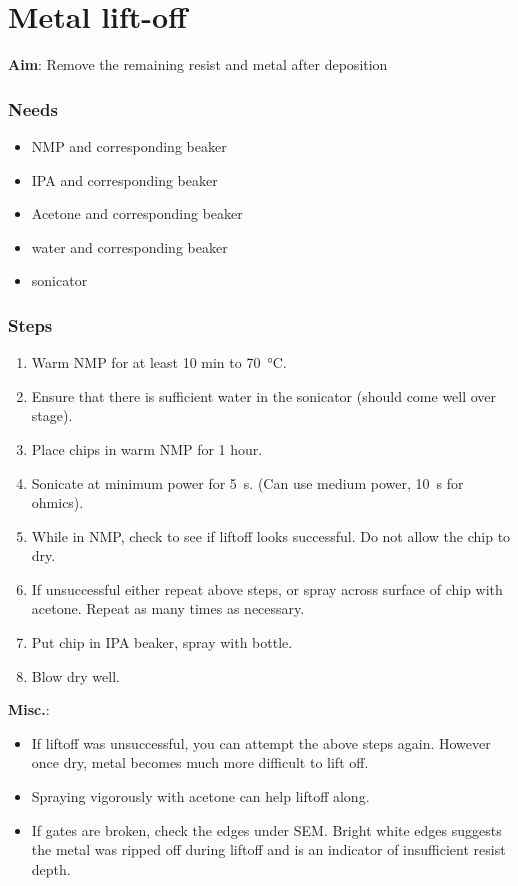 \section{Metal lift-off}

\textbf{Aim}:
Remove the remaining resist and metal after deposition

\subsubsection{Needs}
\begin{itemize}[noitemsep]
\item NMP and corresponding beaker
\item IPA and corresponding beaker
\item Acetone and corresponding beaker
\item water and corresponding beaker
\item sonicator
\end{itemize}

\subsubsection{Steps}
\begin{enumerate}
\item Warm NMP for at least 10 min to \SI{70}{\celsius}.
\item Ensure that there is sufficient water in the sonicator (should come well over stage).
\item Place chips in warm NMP for 1 hour.
\item Sonicate at minimum power for \SI{5}{\second}. (Can use medium power, \SI{10}{\second} for ohmics).
\item While in NMP, check to see if liftoff looks successful. Do not allow the chip to dry.
\item If unsuccessful either repeat above steps, or spray across surface of chip with acetone. Repeat
as many times as necessary.
\item Put chip in IPA beaker, spray with bottle.
\item Blow dry well.
\end{enumerate}

\noindent \textbf{Misc.}:
\begin{itemize}
\item If liftoff was unsuccessful, you can attempt the above steps again. However once dry, metal becomes
much more difficult to lift off.
\item Spraying vigorously with acetone can help liftoff along.
\item If gates are broken, check the edges under SEM. Bright white edges suggests the metal was ripped
off during liftoff and is an indicator of insufficient resist depth.
\end{itemize}
\newpage

